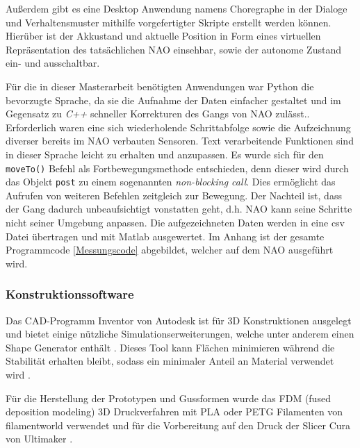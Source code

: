 Außerdem gibt es eine Desktop Anwendung namens Choregraphe in der Dialoge und Verhaltensmuster mithilfe vorgefertigter Skripte erstellt werden können. Hierüber ist der Akkustand und aktuelle Position in Form eines virtuellen Repräsentation des tatsächlichen NAO einsehbar, sowie der autonome Zustand ein- und ausschaltbar. \cite[/Choregraphe Suite/What is Choregraphe]{naoqi_dev_guide}

Für die in dieser Masterarbeit benötigten Anwendungen war Python die bevorzugte Sprache, da sie die Aufnahme der Daten einfacher gestaltet und im Gegensatz zu \textit{C++} schneller Korrekturen des Gangs von NAO zulässt.. Erforderlich waren eine sich wiederholende Schrittabfolge sowie die Aufzeichnung diverser bereits im NAO verbauten Sensoren. Text verarbeitende Funktionen sind in dieser Sprache leicht zu erhalten und anzupassen. Es wurde sich für den \texttt{moveTo()} Befehl als Fortbewegungsmethode entschieden, denn dieser wird durch das Objekt \texttt{post} zu einem sogenannten \textit{non-blocking call}. Dies ermöglicht das Aufrufen von weiteren Befehlen zeitgleich zur Bewegung. Der Nachteil ist, dass der Gang dadurch unbeaufsichtigt vonstatten geht, d.h. NAO kann seine Schritte nicht seiner Umgebung anpassen. Die aufgezeichneten Daten werden in eine csv Datei übertragen und mit Matlab ausgewertet. Im Anhang ist der gesamte Programmcode \ref{Messungscode} abgebildet, welcher auf dem NAO ausgeführt wird. 

\subsubsection*{Konstruktionssoftware}	
Das CAD-Programm Inventor von Autodesk ist für 3D Konstruktionen ausgelegt und bietet einige nützliche Simulationserweiterungen, welche unter anderem einen Shape Generator enthält \cite{inventor}. Dieses Tool kann Flächen minimieren während die Stabilität erhalten bleibt, sodass ein minimaler Anteil an Material verwendet wird \cite{shape_generator}. 

Für die Herstellung der Prototypen und Gussformen wurde das FDM (fused deposition modeling) 3D Druckverfahren mit PLA oder PETG Filamenten von filamentworld \cite{filament} verwendet und für die Vorbereitung auf den Druck der Slicer Cura von Ultimaker \cite{cura}.


